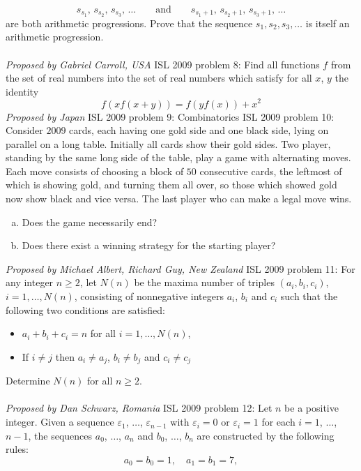 \[
s_{s_1},\, s_{s_2},\, s_{s_3},\, \ldots\qquad\text{and}\qquad s_{s_1+1},\, s_{s_2+1},\, s_{s_3+1},\, \ldots
\]
are both arithmetic progressions. Prove that the sequence $ s_1, s_2, s_3, \ldots$ is itself an arithmetic progression. \\\\
\textit{Proposed by Gabriel Carroll, USA} 
ISL 2009 problem 8:  Find all functions $f$ from the set of real numbers into the set of real numbers which satisfy for all $x$, $y$ the identity
\[ f\left(xf(x+y)\right) = f\left(yf(x)\right) +x^2 \]
\textit{Proposed by Japan} 
ISL 2009 problem 9:  Combinatorics 
ISL 2009 problem 10:  Consider $2009$ cards, each having one gold side and one black side, lying on parallel on a long table. Initially all cards show their gold sides. Two player, standing by the same long side of the table, play a game with alternating moves. Each move consists of choosing a block of $50$ consecutive cards, the leftmost of which is showing gold, and turning them all over, so those which showed gold now show black and vice versa. The last player who can make a legal move wins.
\begin{enumerate}[(a)]
  \item Does the game necessarily end?
  \item Does there exist a winning strategy for the starting player?
\end{enumerate}
\textit{Proposed by Michael Albert, Richard Guy, New Zealand} 
ISL 2009 problem 11:  For any integer $n\geq 2$, let $N(n)$ be the maxima number of triples $(a_i, b_i, c_i)$, $i=1, \ldots, N(n)$, consisting of nonnegative integers $a_i$, $b_i$ and $c_i$ such  that the following two conditions are satisfied:
\begin{itemize}
  \item $a_i+b_i+c_i=n$ for all $i=1, \ldots, N(n)$,
  \item If $i\neq j$ then $a_i\neq a_j$, $b_i\neq b_j$ and $c_i\neq c_j$
\end{itemize}
Determine $N(n)$ for all $n\geq 2$. \\\\
\textit{Proposed by Dan Schwarz, Romania} 
ISL 2009 problem 12:  Let $n$ be a positive integer.  Given a sequence $\varepsilon_1$, $\dots$, $\varepsilon_{n - 1}$ with $\varepsilon_i = 0$ or $\varepsilon_i = 1$ for each $i = 1$, $\dots$, $n - 1$, the sequences $a_0$, $\dots$, $a_n$ and $b_0$, $\dots$, $b_n$ are constructed by the following rules:
\[ a_0 = b_0 = 1, \quad a_1 = b_1 = 7, \]
